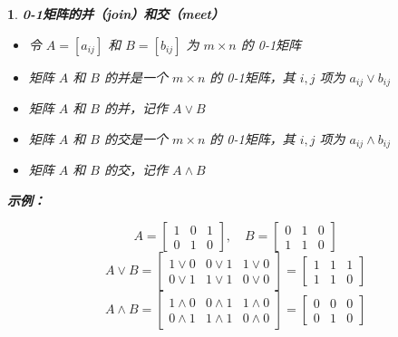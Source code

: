 \documentclass[UTF8]{report}
\theoremstyle{MyLineTheoremStyle} %
\theoremstyle{MyBlockTheoremStyle} %
\theoremstyle{MySubsubsectionStyle} %
\newtheorem{definition}{}
\begin{document}
\begin{definition}
        \textbf{0-1矩阵的并（join）和交（meet）}\par
        \begin{itemize}
            \item 令 $A = [a_{ij}]$ 和 $B = [b_{ij}]$ 为 $m \times n$ 的 0-1矩阵
            \item 矩阵 $A$ 和 $B$ 的并是一个 $m \times n$ 的 0-1矩阵，其 $i,j$ 项为 $a_{ij} \lor b_{ij}$
            \item 矩阵 $A$ 和 $B$ 的并，记作 $A \lor B$
            \item 矩阵 $A$ 和 $B$ 的交是一个 $m \times n$ 的 0-1矩阵，其 $i,j$ 项为 $a_{ij} \land b_{ij}$
            \item 矩阵 $A$ 和 $B$ 的交，记作 $A \land B$
        \end{itemize}
    
        \textbf{示例：}\par
        \[
        A =
        \begin{bmatrix}
        1 & 0 & 1 \\
        0 & 1 & 0
        \end{bmatrix}
        , \quad
        B =
        \begin{bmatrix}
        0 & 1 & 0 \\
        1 & 1 & 0
        \end{bmatrix}
        \]
        \[
        A \lor B =
        \begin{bmatrix}
        1 \lor 0 & 0 \lor 1 & 1 \lor 0 \\
        0 \lor 1 & 1 \lor 1 & 0 \lor 0
        \end{bmatrix}
        =
        \begin{bmatrix}
        1 & 1 & 1 \\
        1 & 1 & 0
        \end{bmatrix}
        \]
        \[
        A \land B =
        \begin{bmatrix}
        1 \land 0 & 0 \land 1 & 1 \land 0 \\
        0 \land 1 & 1 \land 1 & 0 \land 0
        \end{bmatrix}
        =
        \begin{bmatrix}
        0 & 0 & 0 \\
        0 & 1 & 0
        \end{bmatrix}
        \]
    


\end{definition}
\end{document}
